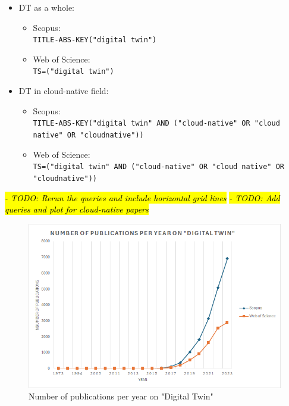 \begin{itemize} 
    \item DT as a whole:
    \begin{itemize}
        \item Scopus: \\ \texttt{TITLE-ABS-KEY("digital twin")} 
        \item Web of Science: \\ \texttt{TS=("digital twin")} 
    \end{itemize}

    \item DT in cloud-native field:
    \begin{itemize}
        \item Scopus: \\ \texttt{TITLE-ABS-KEY("digital twin" AND ("cloud-native" OR "cloud native" OR "cloudnative"))} 
        \item Web of Science: \\ \texttt{TS=("digital twin" AND ("cloud-native" OR "cloud native" OR "cloudnative"))} 
    \end{itemize}

  \end{itemize}
    

\hl{\textit{- TODO: Rerun the queries and include horizontal grid lines}}  
\hl{\textit{- TODO: Add queries and plot for cloud-native papers}}  


\begin{figure}
    \centering
    \includegraphics[width=1\linewidth]{resources/number-of-dt-publications-per-year.png}
    \caption{Number of publications per year on "Digital Twin"}
    \label{fig:dt-publications-per-year}
\end{figure}

